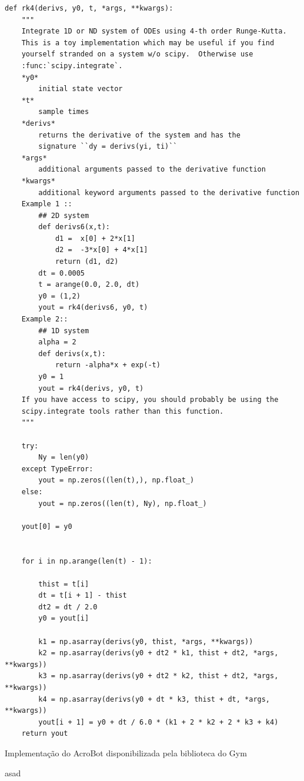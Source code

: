 \documentclass[cic,tc]{iiufrgs}
\newenvironment{longlisting}{\captionsetup{type=listing}}{}
\begin{document}
\begin{longlisting}
\begin{verbatim}
def rk4(derivs, y0, t, *args, **kwargs):
    """
    Integrate 1D or ND system of ODEs using 4-th order Runge-Kutta.
    This is a toy implementation which may be useful if you find
    yourself stranded on a system w/o scipy.  Otherwise use
    :func:`scipy.integrate`.
    *y0*
        initial state vector
    *t*
        sample times
    *derivs*
        returns the derivative of the system and has the
        signature ``dy = derivs(yi, ti)``
    *args*
        additional arguments passed to the derivative function
    *kwargs*
        additional keyword arguments passed to the derivative function
    Example 1 ::
        ## 2D system
        def derivs6(x,t):
            d1 =  x[0] + 2*x[1]
            d2 =  -3*x[0] + 4*x[1]
            return (d1, d2)
        dt = 0.0005
        t = arange(0.0, 2.0, dt)
        y0 = (1,2)
        yout = rk4(derivs6, y0, t)
    Example 2::
        ## 1D system
        alpha = 2
        def derivs(x,t):
            return -alpha*x + exp(-t)
        y0 = 1
        yout = rk4(derivs, y0, t)
    If you have access to scipy, you should probably be using the
    scipy.integrate tools rather than this function.
    """

    try:
        Ny = len(y0)
    except TypeError:
        yout = np.zeros((len(t),), np.float_)
    else:
        yout = np.zeros((len(t), Ny), np.float_)

    yout[0] = y0


    for i in np.arange(len(t) - 1):

        thist = t[i]
        dt = t[i + 1] - thist
        dt2 = dt / 2.0
        y0 = yout[i]

        k1 = np.asarray(derivs(y0, thist, *args, **kwargs))
        k2 = np.asarray(derivs(y0 + dt2 * k1, thist + dt2, *args, **kwargs))
        k3 = np.asarray(derivs(y0 + dt2 * k2, thist + dt2, *args, **kwargs))
        k4 = np.asarray(derivs(y0 + dt * k3, thist + dt, *args, **kwargs))
        yout[i + 1] = y0 + dt / 6.0 * (k1 + 2 * k2 + 2 * k3 + k4)
    return yout

\end{verbatim}
\caption[Cópia de DNA]{Implementação do AcroBot disponibilizada pela biblioteca do Gym}
\label{label}
\end{longlisting}

asad
%



\end{document}
